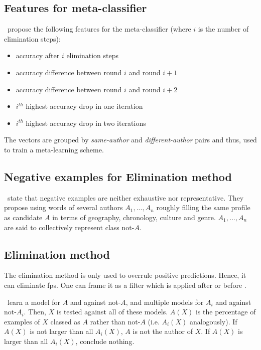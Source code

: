 \subsection{Features for meta-classifier}
\citet{koppel_authorship_2004}\ propose the following features for the meta-classifier 
(where $i$ is the number of elimination steps):
\begin{itemize}
    \item accuracy after $i$ elimination steps
    \item accuracy difference between round $i$ and round $i+1$
    \item accuracy difference between round $i$ and round $i+2$
    \item $i^{th}$ highest accuracy drop in one iteration
    \item $i^{th}$ highest accuracy drop in two iterations
\end{itemize}

The vectors are grouped by \emph{same-author} and \emph{different-author} pairs and thus, 
used to train a meta-learning scheme.

\subsection{Negative examples for Elimination method}
\citet{koppel_authorship_2004}\ state that negative examples are neither exhaustive nor representative.
They propose using words of several authors $A_1, ..., A_n$ roughly filling the same profile as candidate $A$ 
in terms of geography, chronology, culture and genre.
$A_1, ..., A_n$ are said to collectively represent class not-$A$.

\subsection{Elimination method}

The elimination method is only used to overrule positive predictions.
Hence, it can eliminate \acp{fp}.
One can frame it as a filter which is applied after or before \unmasking{}.

\citet{koppel_authorship_2004}\ learn a model for $A$ and against not-$A$, 
and multiple models for $A_i$ and against not-$A_i$.
Then, $X$ is tested against all of these models.
$A(X)$ is the percentage of examples of $X$ classed as $A$ rather than not-$A$ 
(i.e. $A_i(X)$ analogously).
If $A(X)$ is not larger than all $A_i(X)$, $A$ is not the author of $X$.
If $A(X)$ is larger than all $A_i(X)$, conclude nothing.
